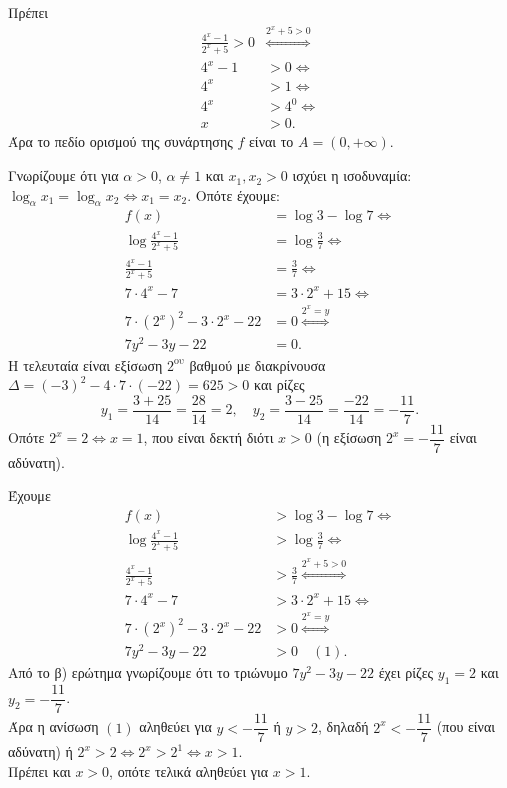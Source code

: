 \begin{alist}
\item Πρέπει
\begin{align*}
\frac{4^x-1}{2^x+5} > 0 &\overset{2^x+5>0}{\iff} \\
4^x - 1 &> 0 \Leftrightarrow \\
4^x &> 1 \Leftrightarrow \\
4^x &> 4^0 \Leftrightarrow \\
x &> 0.
\end{align*}
Άρα το πεδίο ορισμού της συνάρτησης $f$ είναι το $A = (0, +\infty)$.
\item Γνωρίζουμε ότι για $\alpha > 0$, $\alpha \neq 1$ και $x_1, x_2 > 0$ ισχύει η ισοδυναμία: $\log_\alpha x_1 = \log_\alpha x_2 \Leftrightarrow x_1 = x_2$. Οπότε έχουμε:
\begin{align*}
f(x) &= \log 3 - \log 7 \Leftrightarrow \\
\log\frac{4^x-1}{2^x+5} &= \log\frac{3}{7} \Leftrightarrow \\
\frac{4^x-1}{2^x+5} &= \frac{3}{7} \Leftrightarrow \\
7\cdot 4^x - 7 &= 3\cdot 2^x + 15 \Leftrightarrow \\
7\cdot (2^x)^2 - 3\cdot 2^x - 22 &= 0 \overset{2^x=y}{\iff} \\
7y^2 - 3y - 22 &= 0.
\end{align*}
Η τελευταία είναι εξίσωση $2^{\text{ου}}$ βαθμού με διακρίνουσα $\Delta = (-3)^2 - 4\cdot 7\cdot(-22) = 625 > 0$ και ρίζες
\[y_1 = \frac{3+25}{14} = \frac{28}{14} = 2, \quad y_2 = \frac{3-25}{14} = \frac{-22}{14} = -\frac{11}{7}.\]
Οπότε $2^x = 2 \Leftrightarrow x = 1$, που είναι δεκτή διότι $x > 0$ (η εξίσωση $2^x = -\dfrac{11}{7}$ είναι αδύνατη).
\item Έχουμε
\begin{align*}
f(x) &> \log 3 - \log 7 \Leftrightarrow \\
\log\frac{4^x-1}{2^x+5} &> \log\frac{3}{7} \Leftrightarrow \\
\frac{4^x-1}{2^x+5} &> \frac{3}{7} \overset{2^x+5>0}{\iff} \\
7\cdot 4^x - 7 &> 3\cdot 2^x + 15 \Leftrightarrow \\
7\cdot (2^x)^2 - 3\cdot 2^x - 22 &> 0 \overset{2^x=y}{\iff} \\
7y^2 - 3y - 22 &> 0 \quad (1).
\end{align*}
Από το β) ερώτημα γνωρίζουμε ότι το τριώνυμο $7y^2 - 3y - 22$ έχει ρίζες $y_1 = 2$ και $y_2 = -\dfrac{11}{7}$. \\
Άρα η ανίσωση $(1)$ αληθεύει για $y < -\dfrac{11}{7}$ ή $y > 2$, δηλαδή $2^x < -\dfrac{11}{7}$ (που είναι αδύνατη) ή $2^x > 2 \Leftrightarrow 2^x > 2^1 \Leftrightarrow x > 1$. \\
Πρέπει και $x > 0$, οπότε τελικά αληθεύει για $x > 1$.
\end{alist}

